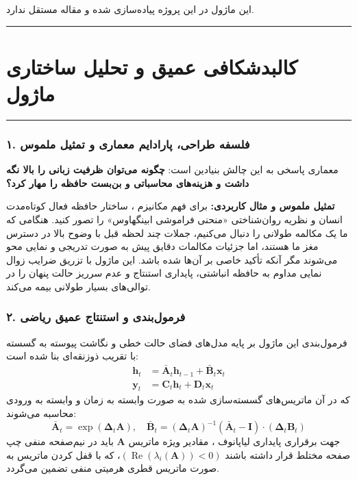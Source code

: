 \clearpage
{}
\vspace*{0.2cm}

این ماژول در این پروژه پیاده‌سازی شده و مقاله مستقل ندارد.
\noindent\rule{\textwidth}{1.2pt}
\vspace*{0.1cm}
\section{کالبدشکافی عمیق و تحلیل ساختاری ماژول }
\label{sec:mod_decay_linear_attention}
\vspace*{-0.2cm}
\noindent\rule{\textwidth}{0.5pt}
\vspace*{0.3cm}

\subsubsection*{۱. فلسفه طراحی، پارادایم معماری و تمثیل ملموس}
معماری  پاسخی به این چالش بنیادین است: \textbf{چگونه می‌توان ظرفیت زبانی را بالا نگه داشت و هزینه‌های محاسباتی و بن‌بست حافظه را مهار کرد؟}

\textbf{تمثیل ملموس و مثال کاربردی:}
برای فهم مکانیزم ، ساختار حافظه فعال کوتاه‌مدت انسان و نظریه روان‌شناختی «منحنی فراموشی ابینگهاوس» را تصور کنید. هنگامی که ما یک مکالمه طولانی را دنبال می‌کنیم، جملات چند لحظه قبل با وضوح بالا در دسترس مغز ما هستند، اما جزئیات مکالمات دقایق پیش به صورت تدریجی و نمایی محو می‌شوند مگر آنکه تأکید خاصی بر آن‌ها شده باشد. این ماژول با تزریق ضرایب زوال نمایی مداوم به حافظه انباشتی، پایداری استنتاج و عدم سرریز حالت پنهان را در توالی‌های بسیار طولانی بیمه می‌کند.

\subsubsection*{۲. فرمول‌بندی و استنتاج عمیق ریاضی }
فرمول‌بندی این ماژول بر پایه مدل‌های فضای حالت خطی و نگاشت پیوسته به گسسته با تقریب ذوزنقه‌ای  بنا شده است:
\begin{align}
\mathbf{h}_t &= \bar{\mathbf{A}}_t \mathbf{h}_{t-1} + \bar{\mathbf{B}}_t \mathbf{x}_t \\
\mathbf{y}_t &= \mathbf{C}_t \mathbf{h}_t + \mathbf{D}_t \mathbf{x}_t
\end{align}
که در آن ماتریس‌های گسسته‌سازی شده به صورت وابسته به زمان و وابسته به ورودی محاسبه می‌شوند:
\begin{equation}
\bar{\mathbf{A}}_t = \exp(\boldsymbol{\Delta}_t \mathbf{A}), \quad \bar{\mathbf{B}}_t = (\boldsymbol{\Delta}_t \mathbf{A})^{-1} (\bar{\mathbf{A}}_t - \mathbf{I}) \cdot (\boldsymbol{\Delta}_t \mathbf{B}_t)
\end{equation}
جهت برقراری پایداری لیاپانوف ، مقادیر ویژه ماتریس $\mathbf{A}$ باید در نیم‌صفحه منفی چپ صفحه مختلط قرار داشته باشند $(\operatorname{Re}(\lambda_i(\mathbf{A})) < 0)$، که با قفل کردن ماتریس به صورت ماتریس قطری هرمیتی منفی تضمین می‌گردد.

